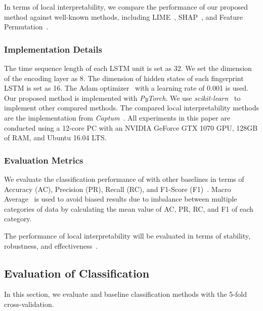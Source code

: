 In terms of local interpretability, we compare the performance of our proposed method against well-known methods, including LIME~\cite{lime}, SHAP~\cite{shap}, and Feature Permutation~\cite{altmann2010permutation}.

\subsubsection{Implementation Details}
The time sequence length of each LSTM unit is set as 32.  
We set the dimension of the encoding layer as 8.
The dimension of hidden states of each fingerprint LSTM is set as 16.
The Adam optimizer~\cite{kingma2014adam} with a learning rate of 0.001 is used.  
Our proposed method \sys is implemented with \emph{PyTorch}. %
We use \emph{scikit-learn}~\cite{scikit-learn} to implement other compared methods.
The compared local interpretability methods are the implementation from \emph{Captum}~\cite{kokhlikyan2020captum}.
All experiments in this paper are conducted using a 12-core PC with an NVIDIA GeForce GTX 1070 GPU, 128GB of RAM, and Ubuntu 16.04 LTS.

\subsubsection{Evaluation Metrics}
We evaluate the classification performance of \sys with other baselines in terms of Accuracy (AC), Precision (PR), Recall (RC), and F1-Score (F1)~\cite{zheng2020learning}.
Macro Average~\cite{liu2017efficient} is used to avoid biased results due to imbalance between multiple categories of data by calculating the mean value of AC, PR, RC, and F1 of each category.

The performance of local interpretability will be evaluated in terms of stability, robustness, and effectiveness~\cite{fan2020can}.

\subsection{Evaluation of Classification}
In this section, we evaluate \sys and baseline classification methods with the 5-fold cross-validation.

